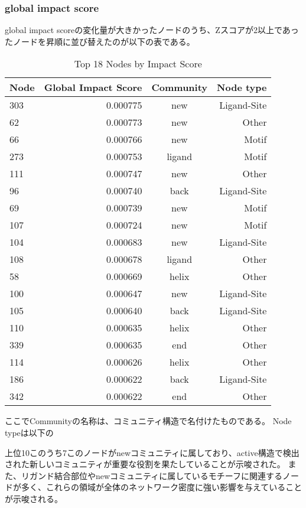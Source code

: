 \subsubsection{global impact score}
global impact scoreの変化量が大きかったノードのうち、Zスコアが2以上であったノードを昇順に並び替えたのが以下の表である。
\begin{table}[ht]
    \centering
    \begin{tabular}{|l|r|c|r|}
    \hline
    \textbf{Node} & \textbf{Global Impact Score} & \textbf{Community} & \textbf{Node type}\\
    \hline
    303 & 0.000775 & new & Ligand-Site \\
    62 & 0.000773 & new & Other \\
    66 & 0.000766 & new & Motif \\
    273 & 0.000753 & ligand & Motif \\
    111 & 0.000747 & new & Other \\
    96 & 0.000740 & back & Ligand-Site \\
    69 & 0.000739 & new & Motif \\
    107 & 0.000724 & new & Motif \\
    104 & 0.000683 & new & Ligand-Site \\
    108 & 0.000678 & ligand & Other \\
    58 & 0.000669 & helix & Other \\
    100 & 0.000647 & new & Ligand-Site \\
    105 & 0.000640 & back & Ligand-Site \\
    110 & 0.000635 & helix & Other \\
    339 & 0.000635 & end & Other \\
    114 & 0.000626 & helix & Other \\
    186 & 0.000622 & back & Ligand-Site \\
    342 & 0.000622 & end & Other \\
    \hline
    \end{tabular}
    \caption{Top 18 Nodes by Impact Score}
\end{table}

ここでCommunityの名称は、コミュニティ構造で名付けたものである。
Node typeは以下の

上位10このうち7このノードがnewコミュニティに属しており、active構造で検出された新しいコミュニティが重要な役割を果たしていることが示唆された。
また、リガンド結合部位やnewコミュニティに属しているモチーフに関連するノードが多く、これらの領域が全体のネットワーク密度に強い影響を与えていることが示唆される。

